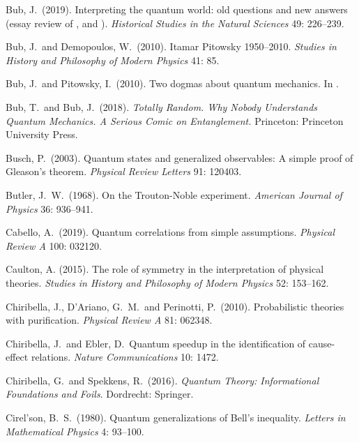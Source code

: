 \documentclass[12pt]{article}
\numberwithin{equation}{section}
\begin{document}
\begin{thebibliography}{}
 Bub, J.\ (2019). Interpreting the quantum world: old questions and new answers (essay review of \citet{Freire 2015}, \citet{Becker 2018} and \citet{Ball 2018}). \emph{Historical Studies in the Natural Sciences} 49: 226--239.

 Bub, J.\ and Demopoulos, W.\ (2010). Itamar Pitowsky 1950--2010. \emph{Studies in History and Philosophy of Modern Physics} 41: 85.

 Bub, J.\ and Pitowsky, I.\ (2010). Two dogmas about quantum mechanics.  In \citet[pp.\ 433--459]{Many Worlds 2010}.

 Bub, T.\ and Bub, J.\ (2018). \emph{Totally Random. Why Nobody Understands Quantum Mechanics. A Serious Comic on Entanglement.} Princeton: Princeton University Press.

 Busch, P.\ (2003). Quantum states and generalized observables: A simple proof of Gleason's theorem. \emph{Physical Review Letters} 91: 120403.

 Butler, J.\ W.\ (1968). On the Trouton-Noble experiment. \emph{American Journal of Physics} 36: 936--941.

 Cabello, A.\ (2019). Quantum correlations from simple assumptions. \emph{Physical Review A} 100: 032120.

 Caulton, A. (2015). The role of symmetry in the interpretation of physical theories. \emph{Studies in History and Philosophy of Modern Physics} 52: 153--162.

 Chiribella, J., D'Ariano, G.\ M.\ and Perinotti, P.\  (2010). Probabilistic theories with purification. \emph{Physical Review A} 81:
062348.

 Chiribella, J.\ and Ebler, D.\, Quantum speedup in the identification of cause-effect relations. \emph{Nature Communications} 10: 1472.

 Chiribella, G.\ and Spekkens, R.\ (2016). \emph{Quantum Theory: Informational Foundations and Foils}. Dordrecht: Springer.

 Cirel'son, B.\ S.\ (1980). Quantum generalizations of Bell's inequality. \emph{Letters in Mathematical Physics} 4: 93--100.


\end{thebibliography}
\end{document}
